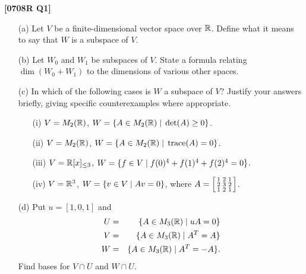 \documentclass[a4paper]{article}
\begin{document}
\begin{problem}\textbf{[0708R Q1]}
 \begin{itemize}
  \item[(a)] Let $V$ be a finite-dimensional vector space over ${\mathbb{R}}$.  
   Define what it means to say that $W$ is a subspace of $V$.
  \item[(b)] Let $W_0$ and $W_1$ be subspaces of $V$.  State a formula
   relating $\dim(W_0+W_1)$ to the dimensions of various other spaces.
  \item[(c)] In which of the following cases is $W$ a subspace of $V$?
   Justify your answers briefly, giving specific
   counterexamples where appropriate. 
   \begin{itemize}
    \item[(i)] $V=M_2({\mathbb{R}})$, $W=\{A\in M_2({\mathbb{R}})\;|\;\det(A)\geq 0\}$.
    \item[(ii)] $V=M_2({\mathbb{R}})$, $W=\{A\in M_2({\mathbb{R}})\;|\;\operatorname{trace}(A)=0\}$.
    \item[(iii)] $V={\mathbb{R}}[x]_{\leq 3}$, $W=\{f\in V\;|\; f(0)^4+f(1)^4+f(2)^4=0\}$.
    \item[(iv)] $V={\mathbb{R}}^3$, $W=\{v\in V\;|\; Av=0\}$, where
     $A=\left[\begin{smallmatrix} 1&2&1\\2&3&2\\1&2&1\end{smallmatrix}\right]$.
   \end{itemize}
  \item[(d)] Put $u=[1,0,1]$ and 
   \begin{eqnarray*}
    U &=& \{A\in M_3({\mathbb{R}})\;|\; uA=0\} \\
    V &=& \{A\in M_3({\mathbb{R}})\;|\; A^T=A\} \\
    W &=& \{A\in M_3({\mathbb{R}})\;|\; A^T=-A\}.
   \end{eqnarray*}
   Find bases for $V\cap U$ and $W\cap U$. 
 \end{itemize}
\end{problem}
\end{document}
